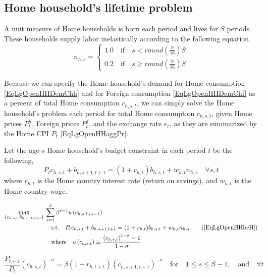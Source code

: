   \subsection{Home household's lifetime problem}\label{SecLgOpenHHlifeH}

    A unit measure of Home households is born each period and lives for $S$ periods. These households supply labor inelastically according to the following equation.
    \begin{equation}\label{EqLgOpenHHlabH}
      n_{h,s} =
        \begin{cases}
          1.0 \quad\text{if}\quad s < round\left(\frac{9}{16}\right)S \\
          0.2 \quad\text{if}\quad s \geq round\left(\frac{9}{16}\right)S
        \end{cases}
    \end{equation}

    Because we can specify the Home household's demand for Home consumption \eqref{EqLgOpenHHDemChh} and for Foreign consumption \eqref{EqLgOpenHHDemChf} as a percent of total Home consumption $c_{h,s,t}$, we can simply solve the Home household's problem each period for total Home consumption $c_{h,s,t}$, given Home prices $P^h_t$, Foreign prices $P^f_t$, and the exchange rate $e_t$, as they are summarized by the Home CPI $P_t$ \eqref{EqLgOpenHHaggPr}.

    Let the age-$s$ Home household's budget constraint in each period $t$ be the following,
    \begin{equation}\label{EqLgOpenHHbcH}
      P_t c_{h,s,t} + b_{h,s+1,t+1} = (1 + r_{h,t})b_{h,s,t} + w_{h,t}n_{h,s} \quad\forall s, t
    \end{equation}
    where $r_{h,t}$ is the Home country interest rate (return on savings), and $w_{h,t}$ is the Home country wage.

    \begin{align}
      \max_{\{c_{h,s,t},b_{h,s+1,t+1}\}}\: &\sum_{s=1}^S \beta^{s-1}u\left(c_{h,s,t+s-1}\right) \label{EqLgOpenHHmaxprobH} \\
      &\quad\text{s.t.}\quad P_t c_{h,s,t} + b_{h,s+1,t+1} = (1 + r_{h,t})b_{h,s,t} + w_{h,t}n_{h,s} \tag{\ref{EqLgOpenHHbcH}} \\
      &\quad\text{where}\quad u\left(c_{h,s,t}\right) \equiv \frac{\left(c_{h,s,t}\right)^{1-\sigma} - 1}{1 - \sigma}
    \end{align}

    \begin{equation}\label{EqLgOpenHHeul_bH}
      \frac{P_{t+1}}{P_t}\left(c_{h,s,t}\right)^{-\sigma} = \beta(1 + r_{h,t+1})\left(c_{h,s+1,t+1}\right)^{-\sigma} \quad\text{for}\quad 1\leq s\leq S-1,\quad\text{and}\quad\forall t
    \end{equation}


